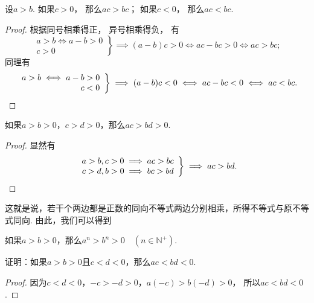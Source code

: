 \begin{theorem}
设\(a>b\).
如果\(c>0\)，
那么\(ac>bc\)；
如果\(c<0\)，
那么\(ac<bc\).
\begin{proof}
根据同号相乘得正，
异号相乘得负，
有\[
	\left. \begin{array}{r}
		a>b \iff a-b>0 \\
		c>0
	\end{array} \right\}
	\implies (a-b)c>0
	\iff ac-bc>0
	\iff ac>bc;
\]
同理有\[
	\left. \begin{array}{r}
		a>b \iff a-b> 0 \\
		c<0
	\end{array} \right\}
	\implies (a-b)c<0
	\iff ac-bc<0
	\iff ac<bc.
	\qedhere
\]
\end{proof}
\end{theorem}

\begin{corollary}
如果\(a>b>0\)，\(c>d>0\)，那么\(ac>bd>0\).
\begin{proof}
显然有\[
	\left. \begin{array}{r}
		a>b,c>0 \implies ac>bc \\
		c>d,b>0 \implies bc>bd
	\end{array} \right\}
	\implies ac>bd.
	\qedhere
\]
\end{proof}
\end{corollary}
这就是说，若干个两边都是正数的同向不等式两边分别相乘，所得不等式与原不等式同向.
由此，我们可以得到
\begin{corollary}
如果\(a>b>0\)，那么\(a^n>b^n>0 \quad (n\in\mathbb{N}^+)\).
\end{corollary}

\begin{example}
证明：如果\(a > b > 0\)且\(c < d < 0\)，那么\(ac < bd < 0\).
\begin{proof}
因为\(c < d < 0\)，\(-c > -d > 0\)，\(a(-c) > b(-d) > 0\)，
所以\(ac < bd < 0\).
\end{proof}
\end{example}

